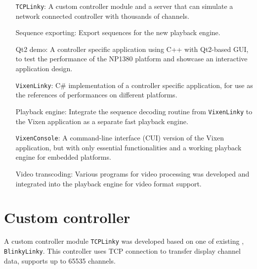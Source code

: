 \renewcommand{\baselinestretch}{\mystretch}
\label{chap:Impl}

 

\begin{enumerate}[noitemsep,leftmargin=4cm]
  \item[\texttt{TCPLinky}:] A custom controller module and a server that can simulate a network connected controller with thousands of channels.
  \item[Sequence exporting:] Export sequences for the new playback engine.
  \item[Qt2 demo:] A controller specific application using C++ with Qt2-based GUI, to test the performance of the NP1380 platform and showcase an interactive application design.
  \item[\texttt{VixenLinky}:] C\# implementation of a controller specific application, for use as the references of  performances on different platforms.
  \item[Playback engine:] Integrate the sequence decoding routine from \texttt{VixenLinky} to the Vixen application as a separate fast playback engine.
  \item[\texttt{VixenConsole}:] A command-line interface (CUI) version of the Vixen application, but with only essential functionalities and a working playback engine for embedded platforms.
  \item[Video transcoding:] Various programs for video processing was developed and integrated into the playback engine for video format support.
\end{enumerate}

\newpage

\section{Custom controller}
\label{sec:tcplinky}

A custom controller module  \texttt{TCPLinky} was developed based on one of  existing , \texttt{BlinkyLinky}. This controller uses TCP connection to transfer display channel data,  supports up to 65535 channels.

